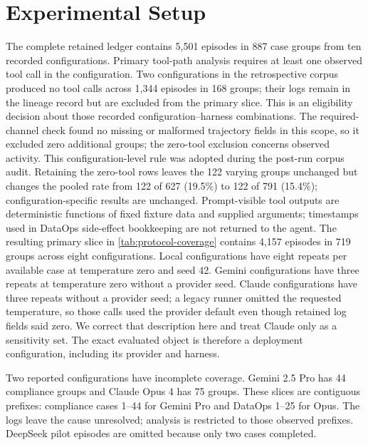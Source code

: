 \documentclass{article}
\begin{document}
\section{Experimental Setup}

The complete retained ledger contains 5,501 episodes in 887 case groups from
ten recorded configurations.  Primary tool-path analysis requires at least one
observed tool call in the configuration.  Two configurations in the
retrospective corpus produced no tool calls across 1,344 episodes in 168 groups;
their logs remain in
the lineage record but are excluded from the primary slice.  This is an
eligibility decision about those recorded configuration--harness combinations.  The
required-channel check found no missing or malformed trajectory fields in this
scope, so it excluded zero additional groups; the zero-tool exclusion concerns
observed activity.  This configuration-level rule was adopted
during the post-run corpus audit.  Retaining the zero-tool
rows leaves the 122 varying groups unchanged but changes the pooled rate from
122 of 627 (19.5\%) to 122 of 791 (15.4\%); configuration-specific results are
unchanged.  Prompt-visible tool outputs are
deterministic functions of fixed fixture data and supplied arguments; timestamps
used in DataOps side-effect bookkeeping are not returned to the agent.
The
resulting primary slice in \autoref{tab:protocol-coverage} contains 4,157 episodes
in 719 groups across eight configurations.  Local configurations have eight repeats per available case at
temperature zero and seed 42.  Gemini configurations have three repeats at
temperature zero without a provider seed.  Claude configurations have three
repeats without a provider seed; a legacy runner omitted the requested
temperature, so those calls used the provider default even though retained
log fields said zero.  We correct that description here and treat Claude only
as a sensitivity set.  The exact evaluated object is therefore a deployment
configuration, including its provider and harness.

Two reported configurations have incomplete coverage.  Gemini 2.5 Pro has 44
compliance groups and Claude Opus 4 has 75 groups.  These slices are contiguous
prefixes: compliance cases 1--44 for Gemini Pro and DataOps 1--25 for Opus.
The logs leave the cause unresolved; analysis is restricted to those observed
prefixes.  DeepSeek pilot episodes are
omitted because only two cases completed.
\end{document}
